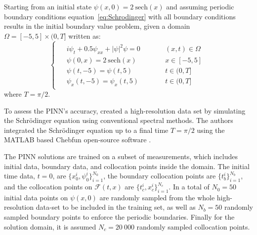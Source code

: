\documentclass[pdflatex,sn-basic]{sn-jnl}%
\theoremstyle{thmstyleone}%
\theoremstyle{thmstyletwo}%
\theoremstyle{thmstylethree}%
\begin{document}
Starting from an initial state $\psi(x,0) = 2\ \text{sech}(x)$ and assuming periodic boundary conditions equation~\eqref{eq:Schrodinger} with all boundary conditions results in the initial boundary value problem, given a domain $\Omega = [-5, 5] \times (0,T]$  written as:
\begin{equation}\label{eq:IBVPSchrodinger}
  \begin{cases}
    {\begin{alignedat}{3}
    & i \psi_t + 0.5 \psi_{xx} + \lvert\psi\rvert^2 \psi = 0   & \qquad & (x,t)\in \Omega  \\
     & \psi(0,x) = 2\ \text{sech}(x) &&  x \in[-5, 5] \\
     & \psi(t,-5) = \psi(t,5)%
     &&  t \in (0,T]\\
     & \psi_x(t,-5) = \psi_x(t,5)
     &&  t \in (0,T]
    \end{alignedat}}
  \end{cases}
\end{equation}
where %
$T=\pi/2$.


To assess the PINN’s accuracy, \cite{Rai2017_PhysicsInformedDeep1_PerRPK} created a high-resolution data set by simulating the Schrödinger equation using conventional spectral methods.
The authors integrated the Schrödinger equation up to a final time $T=\pi/2$ using the MATLAB based Chebfun open-source software
\citep{Driscoll2014}.


The PINN solutions are trained on a subset of measurements, which includes initial data, boundary data, and collocation points inside the domain. 
The initial time data, $t=0$, are  $\{x_0^i, \psi^i_0\}_{i=1}^{N_0}$, the boundary collocation points are $\{t^i_b\}_{i=1}^{N_b}$, and the collocation points on $\mathcal{F}(t,x)$ are $\{t_c^i,x_c^i\}_{i=1}^{N_c}$.
In \cite{Rai2017_PhysicsInformedDeep1_PerRPK}
a total of $N_0 = 50$ initial data points on $\psi(x,0)$  are randomly sampled from the whole high-resolution data-set to be included in the training set, as well as $N_b = 50$ randomly sampled boundary points to enforce the periodic boundaries.
Finally for the solution domain, it is assumed $N_c=20\ 000$ randomly sampled collocation points.
\end{document}
